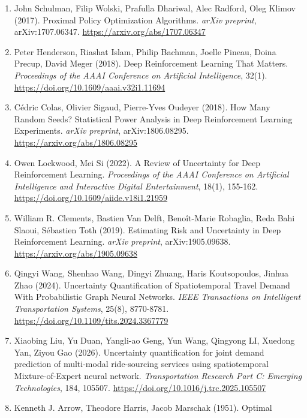 \documentclass[
]{article}
\begin{document}
\begin{enumerate}
  (2024). Adaptive rescheduling of rail transit services with
  short-turnings under disruptions via a multi-agent deep reinforcement
  learning approach. \emph{Transportation Research Part B:
  Methodological}, 188, 103067.
  \url{https://doi.org/10.1016/j.trb.2024.103067}
\item
  John Schulman, Filip Wolski, Prafulla Dhariwal, Alec Radford, Oleg
  Klimov (2017). Proximal Policy Optimization Algorithms. \emph{arXiv
  preprint}, arXiv:1707.06347. \url{https://arxiv.org/abs/1707.06347}
\item
  Peter Henderson, Riashat Islam, Philip Bachman, Joelle Pineau, Doina
  Precup, David Meger (2018). Deep Reinforcement Learning That Matters.
  \emph{Proceedings of the AAAI Conference on Artificial Intelligence},
  32(1). \url{https://doi.org/10.1609/aaai.v32i1.11694}
\item
  Cédric Colas, Olivier Sigaud, Pierre-Yves Oudeyer (2018). How Many
  Random Seeds? Statistical Power Analysis in Deep Reinforcement
  Learning Experiments. \emph{arXiv preprint}, arXiv:1806.08295.
  \url{https://arxiv.org/abs/1806.08295}
\item
  Owen Lockwood, Mei Si (2022). A Review of Uncertainty for Deep
  Reinforcement Learning. \emph{Proceedings of the AAAI Conference on
  Artificial Intelligence and Interactive Digital Entertainment}, 18(1),
  155-162. \url{https://doi.org/10.1609/aiide.v18i1.21959}
\item
  William R. Clements, Bastien Van Delft, Benoît-Marie Robaglia, Reda
  Bahi Slaoui, Sébastien Toth (2019). Estimating Risk and Uncertainty in
  Deep Reinforcement Learning. \emph{arXiv preprint}, arXiv:1905.09638.
  \url{https://arxiv.org/abs/1905.09638}
\item
  Qingyi Wang, Shenhao Wang, Dingyi Zhuang, Haris Koutsopoulos, Jinhua
  Zhao (2024). Uncertainty Quantification of Spatiotemporal Travel
  Demand With Probabilistic Graph Neural Networks. \emph{IEEE
  Transactions on Intelligent Transportation Systems}, 25(8), 8770-8781.
  \url{https://doi.org/10.1109/tits.2024.3367779}
\item
  Xiaobing Liu, Yu Duan, Yangli-ao Geng, Yun Wang, Qingyong LI, Xuedong
  Yan, Ziyou Gao (2026). Uncertainty quantification for joint demand
  prediction of multi-modal ride-sourcing services using spatiotemporal
  Mixture-of-Expert neural network. \emph{Transportation Research Part
  C: Emerging Technologies}, 184, 105507.
  \url{https://doi.org/10.1016/j.trc.2025.105507}
\item
  Kenneth J. Arrow, Theodore Harris, Jacob Marschak (1951). Optimal

\end{enumerate}
\end{document}
